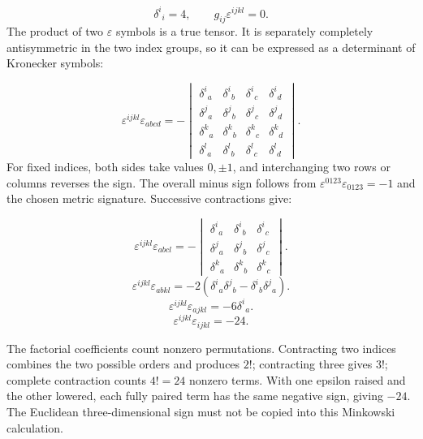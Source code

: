\documentclass[a4paper,12pt]{article}
\begin{document}
\begin{equation}\label{simple-contract}
\delta^i{}_i=4,\qquad g_{ij}\varepsilon^{ijkl}=0.
\end{equation}
The product of two $\varepsilon$ symbols is a true tensor. It is separately completely antisymmetric in the two index groups, so it can be expressed as a determinant of Kronecker symbols:

\begin{equation}\label{epsilon-determinant}
\varepsilon^{ijkl}\varepsilon_{abcd}=-\begin{vmatrix}\delta^i{}_a&\delta^i{}_b&\delta^i{}_c&\delta^i{}_d\\\delta^j{}_a&\delta^j{}_b&\delta^j{}_c&\delta^j{}_d\\\delta^k{}_a&\delta^k{}_b&\delta^k{}_c&\delta^k{}_d\\\delta^l{}_a&\delta^l{}_b&\delta^l{}_c&\delta^l{}_d\end{vmatrix}.
\end{equation}
For fixed indices, both sides take values $0,\pm1$, and interchanging two rows or columns reverses the sign. The overall minus sign follows from $\varepsilon^{0123}\varepsilon_{0123}=-1$ and the chosen metric signature. Successive contractions give:

\begin{equation}\label{epsilon-one}
\varepsilon^{ijkl}\varepsilon_{abcl}=-\begin{vmatrix}\delta^i{}_a&\delta^i{}_b&\delta^i{}_c\\\delta^j{}_a&\delta^j{}_b&\delta^j{}_c\\\delta^k{}_a&\delta^k{}_b&\delta^k{}_c\end{vmatrix}.
\end{equation}
\begin{equation}\label{epsilon-two}
\varepsilon^{ijkl}\varepsilon_{abkl}=-2(\delta^i{}_a\delta^j{}_b-\delta^i{}_b\delta^j{}_a).
\end{equation}
\begin{equation}\label{epsilon-three}
\varepsilon^{ijkl}\varepsilon_{ajkl}=-6\delta^i{}_a.
\end{equation}
\begin{equation}\label{epsilon-four}
\varepsilon^{ijkl}\varepsilon_{ijkl}=-24.
\end{equation}

The factorial coefficients count nonzero permutations. Contracting two indices combines the two possible orders and produces $2!$; contracting three gives $3!$; complete contraction counts $4!=24$ nonzero terms. With one epsilon raised and the other lowered, each fully paired term has the same negative sign, giving $-24$. The Euclidean three-dimensional sign must not be copied into this Minkowski calculation.
\end{document}
